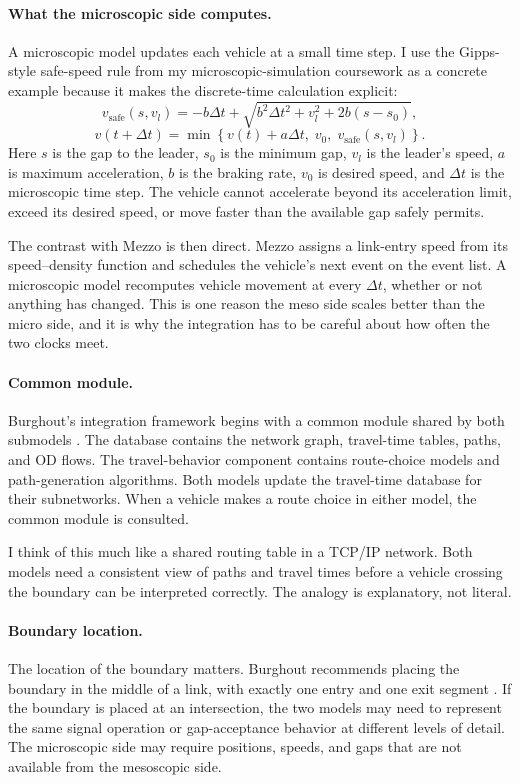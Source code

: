 \begin{bibunit}[plainnat]
\paragraph*{What the microscopic side computes.}
A microscopic model updates each vehicle at a small time step. I use the
Gipps-style safe-speed rule from my microscopic-simulation coursework as a
concrete example because it makes the discrete-time calculation explicit:
\[
  v_{\mathrm{safe}}(s,v_l)
  =
  -b\Delta t+
  \sqrt{
    b^2\Delta t^2+v_l^2+2b(s-s_0)
  },
\]
\[
  v(t+\Delta t)
  =
  \min\left\{
    v(t)+a\Delta t,\;
    v_0,\;
    v_{\mathrm{safe}}(s,v_l)
  \right\}.
\]
Here $s$ is the gap to the leader, $s_0$ is the minimum gap, $v_l$ is the
leader's speed, $a$ is maximum acceleration, $b$ is the braking rate, $v_0$ is
desired speed, and $\Delta t$ is the microscopic time step. The vehicle cannot
accelerate beyond its acceleration limit, exceed its desired speed, or move
faster than the available gap safely permits.

The contrast with Mezzo is then direct. Mezzo assigns a link-entry speed from
its speed--density function and schedules the vehicle's next event on the event
list. A microscopic model recomputes vehicle movement at every $\Delta t$,
whether or not anything has changed. This is one reason the meso side scales
better than the micro side, and it is why the integration has to be careful
about how often the two clocks meet.

\paragraph*{Common module.}
Burghout's integration framework begins with a common module shared by both
submodels \citep{burghout2004thesis,burghout2005hybrid}. The database contains
the network graph, travel-time tables, paths, and OD flows. The travel-behavior
component contains route-choice models and path-generation algorithms. Both
models update the travel-time database for their subnetworks. When a vehicle
makes a route choice in either model, the common module is consulted.

I think of this much like a shared routing table in a TCP/IP network. Both
models need a consistent view of paths and travel times before a vehicle
crossing the boundary can be interpreted correctly. The analogy is explanatory,
not literal.

\paragraph*{Boundary location.}
The location of the boundary matters. Burghout recommends placing the boundary
in the middle of a link, with exactly one entry and one exit segment
\citep{burghout2005hybrid}. If the boundary is placed at an intersection, the
two models may need to represent the same signal operation or gap-acceptance
behavior at different levels of detail. The microscopic side may require
positions, speeds, and gaps that are not available from the mesoscopic side.


\end{bibunit}
